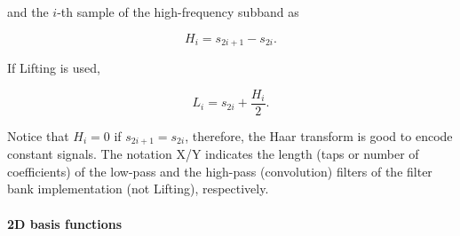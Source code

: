 and the \(i\)-th sample of the high-frequency subband as

\begin{equation}
  H_i=s_{2i+1}-s_{2i}.
  \tag{HaarH}
  \label{eq:Haar_A-HPF}
\end{equation}

If Lifting is used,

\begin{equation}
  L_i=s_{2i}+\frac{H_i}{2}.
  \tag{HaarLLifted}
  \label{eq:Haar_A-LPF-lifting}
\end{equation}

Notice that \(H_i=0\) if \(s_{2i+1}=s_{2i}\), therefore, the Haar
transform is good to encode constant signals. The notation X/Y indicates
the length (taps or number of coefficients) of the low-pass and the
high-pass (convolution) filters of the filter bank implementation (not
Lifting), respectively.

    \hypertarget{d-basis-functions}{%
\paragraph{2D basis functions}\label{d-basis-functions}}

